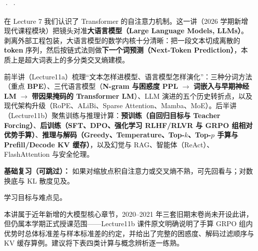 



 ·  · 

在 Lecture 7 我们认识了 Transformer 的自注意力机制。这一讲（2026 学期新增现代课程模块）把镜头对准\textbf{大语言模型（Large Language Models, LLMs）}。剥离外部工程包装，大语言模型的数学内核十分清晰：把一段文本切成离散的 \textbf{token} 序列，然后按链式法则做\textbf{下一个词预测（Next-Token Prediction）}，本质上是超大词表上的多分类交叉熵建模。

前半讲（Lecture11a）梳理“文本怎样进模型、语言模型怎样演化”：三种分词方法（重点 \textbf{BPE}）、三代语言模型（\textbf{N-gram 与困惑度 PPL} \ensuremath{\to} \textbf{词嵌入与早期神经 LM} \ensuremath{\to} \textbf{带因果掩码的 Transformer LM}）、LLM 演进的五个历史转折点，以及现代架构升级（RoPE、ALiBi、Sparse Attention、Mamba、MoE）。后半讲（Lecture11b）聚焦训练与推理计算：\textbf{预训练（自回归目标与 Teacher Forcing）}、\textbf{后训练（SFT、DPO、强化学习 RLHF/RLVR 与 GRPO 组相对优势手算）}、\textbf{推理与解码（Greedy、Temperature、Top-$k$、Top-$p$ 手算与 Prefill/Decode KV 缓存）}，以及幻觉与 RAG、智能体（ReAct）、FlashAttention 与安全伦理。

\textbf{基础复习（可跳过）：} 如果对缩放点积自注意力或交叉熵不熟，可先回看与；对数换底与 KL 散度见及。

学习目标与难点见。



本讲属于近年新增的大模型核心章节，2020–2021 年三套旧期末卷尚未开设此讲，但仍属本学期正式授课范围——Lecture11b 课件原文明确说明了手算 GRPO 组内优势时总体标准差与样本标准差的约定，并给出了完整的困惑度、解码过滤顺序与 KV 缓存算例。建议将下表四类计算与概念辨析逐一练熟。

